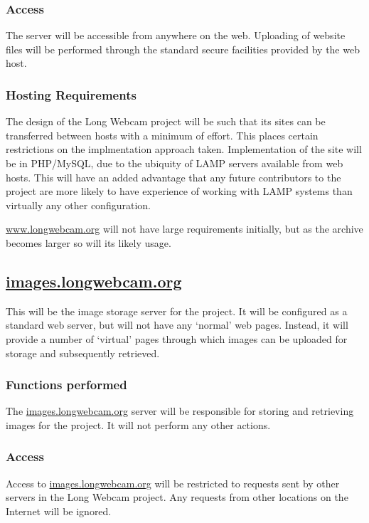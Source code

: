 \documentclass[11pt]{article}
\begin{document}
\subsubsection{Access}
The server will be accessible from anywhere on the web. Uploading of website files will be performed through the standard secure facilities provided by the web host.

\subsubsection{Hosting Requirements}
The design of the Long Webcam project will be such that its sites can be transferred between hosts with a minimum of effort. This places certain restrictions on the implmentation approach taken. Implementation of the site will be in PHP/MySQL, due to the ubiquity of LAMP servers available from web hosts. This will have an added advantage that any future contributors to the project are more likely to have experience of working with LAMP systems than virtually any other configuration.

\url{www.longwebcam.org} will not have large requirements initially, but as the archive becomes larger so will its likely usage.


\subsection{\protect\url{images.longwebcam.org}}
This will be the image storage server for the project. It will be configured as a standard web server, but will not have any `normal' web pages. Instead, it will provide a number of `virtual' pages through which images can be uploaded for storage and subsequently retrieved.

\subsubsection{Functions performed}
The \url{images.longwebcam.org} server will be responsible for storing and retrieving images for the project. It will not perform any other actions.

\subsubsection{Access}
Access to \url{images.longwebcam.org} will be restricted to requests sent by other servers in the Long Webcam project. Any requests from other locations on the Internet will be ignored.
\end{document}
